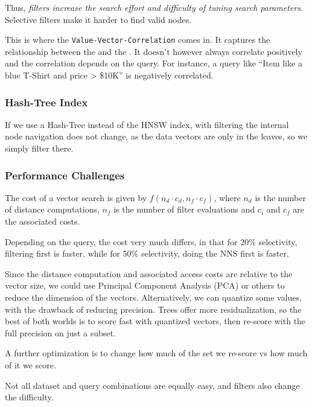 Thus, \textit{filters increase the search effort and difficulty of tuning search parameters}.
Selective filters make it harder to find valid nodes.

This is where the \texttt{Value-Vector-Correlation} comes in. It captures the relationship between the 
and the .
It doesn't however always correlate positively and the correlation depends on the query.
For instance, a query like ``Item like a blue T-Shirt and price > \$10K'' is negatively correlated.


\subsubsection{Hash-Tree Index}
If we use a Hash-Tree instead of the HNSW index, with filtering the internal node navigation does not change, as the data vectors are only in the leaves,
so we simply filter there.


\subsubsection{Performance Challenges}
The cost of a vector search is given by $f(n_d \cdot c_d, n_f \cdot c_f)$, where $n_d$ is the number of distance computations, $n_f$ is the number of filter evaluations
and $c_i$ and $c_f$ are the associated costs.

Depending on the query, the cost very much differs, in that for 20\% selectivity, filtering first is faster, while for 50\% selectivity, doing the NNS first is faster.

Since the distance computation and associated access costs are relative to the vector size,
we could use Principal Component Analysis (PCA) or others to reduce the dimension of the vectors.
Alternatively, we can quantize some values, with the drawback of reducing precision.
Trees offer more residualization, so the best of both worlds is to score fast with quantized vectors, then re-score with the full precision on just a subset.

A further optimization is to change how much of the set we re-score vs how much of it we score.

Not all dataset and query combinations are equally easy, and filters also change the difficulty.


